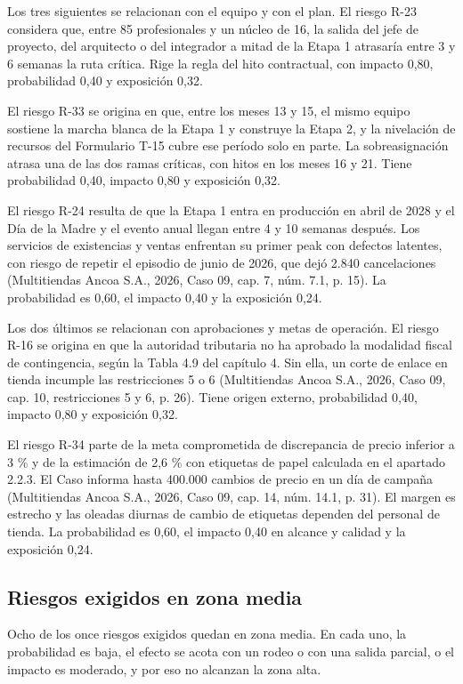 \documentclass[11pt]{article}
\begin{document}
Los tres siguientes se relacionan con el equipo y con el plan. El riesgo R-23 considera que, entre 85 profesionales y un núcleo de 16, la salida del jefe de proyecto, del arquitecto o del integrador a mitad de la Etapa 1 atrasaría entre 3 y 6 semanas la ruta crítica. Rige la regla del hito contractual, con impacto 0,80, probabilidad 0,40 y exposición 0,32.

El riesgo R-33 se origina en que, entre los meses 13 y 15, el mismo equipo sostiene la marcha blanca de la Etapa 1 y construye la Etapa 2, y la nivelación de recursos del Formulario T-15 cubre ese período solo en parte. La sobreasignación atrasa una de las dos ramas críticas, con hitos en los meses 16 y 21. Tiene probabilidad 0,40, impacto 0,80 y exposición 0,32.

El riesgo R-24 resulta de que la Etapa 1 entra en producción en abril de 2028 y el Día de la Madre y el evento anual llegan entre 4 y 10 semanas después. Los servicios de existencias y ventas enfrentan su primer peak con defectos latentes, con riesgo de repetir el episodio de junio de 2026, que dejó 2.840 cancelaciones (Multitiendas Ancoa S.A., 2026, Caso 09, cap. 7, núm. 7.1, p. 15). La probabilidad es 0,60, el impacto 0,40 y la exposición 0,24.

Los dos últimos se relacionan con aprobaciones y metas de operación. El riesgo R-16 se origina en que la autoridad tributaria no ha aprobado la modalidad fiscal de contingencia, según la Tabla 4.9 del capítulo 4. Sin ella, un corte de enlace en tienda incumple las restricciones 5 o 6 (Multitiendas Ancoa S.A., 2026, Caso 09, cap. 10, restricciones 5 y 6, p. 26). Tiene origen externo, probabilidad 0,40, impacto 0,80 y exposición 0,32.

El riesgo R-34 parte de la meta comprometida de discrepancia de precio inferior a 3 \% y de la estimación de 2,6 \% con etiquetas de papel calculada en el apartado 2.2.3. El Caso informa hasta 400.000 cambios de precio en un día de campaña (Multitiendas Ancoa S.A., 2026, Caso 09, cap. 14, núm. 14.1, p. 31). El margen es estrecho y las oleadas diurnas de cambio de etiquetas dependen del personal de tienda. La probabilidad es 0,60, el impacto 0,40 en alcance y calidad y la exposición 0,24.

\subsection{Riesgos exigidos en zona media}

Ocho de los once riesgos exigidos quedan en zona media. En cada uno, la probabilidad es baja, el efecto se acota con un rodeo o con una salida parcial, o el impacto es moderado, y por eso no alcanzan la zona alta.
\end{document}
